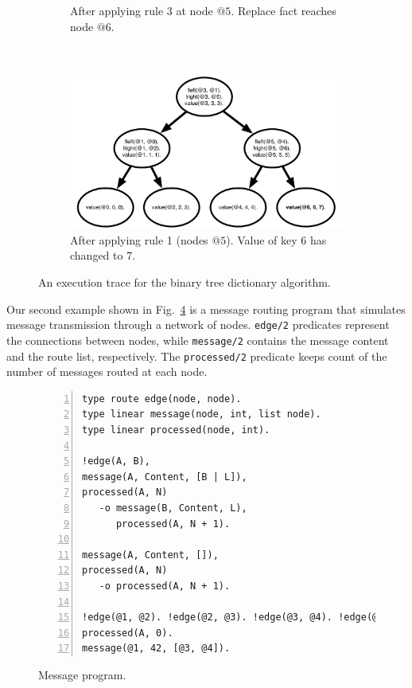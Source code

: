 \begin{figure}[h]
\begin{subfigure}[b]{0.5\textwidth}
                \caption{After applying rule 3 at node $@5$. Replace fact reaches node $@6$.}
                \label{fig:btree_trace3}
        \end{subfigure}%
        ~
        \begin{subfigure}[b]{0.5\textwidth}
                  \includegraphics[width=\textwidth]{btree_trace4}
                  \caption{After applying rule 1 (nodes $@5$). Value of key 6 has changed to 7.}
                  \label{fig:btree_trace4}
          \end{subfigure}
        \caption{An execution trace for the binary tree dictionary algorithm.}\label{fig:btree_trace}
\end{figure}

Our second example shown in Fig.~\ref{code:message} is a message routing program
that simulates message transmission through a network of nodes.
\texttt{edge/2} predicates represent the connections between nodes, while
\texttt{message/2} contains the message content and the route list, respectively.
The \texttt{processed/2} predicate keeps count of the number of messages routed at each node.

\begin{figure}[h!]
\small\begin{Verbatim}[numbers=left]
type route edge(node, node).
type linear message(node, int, list node).
type linear processed(node, int).

!edge(A, B),
message(A, Content, [B | L]),
processed(A, N)
   -o message(B, Content, L),
      processed(A, N + 1).

message(A, Content, []),
processed(A, N)
   -o processed(A, N + 1).

!edge(@1, @2). !edge(@2, @3). !edge(@3, @4). !edge(@1, @3).
processed(A, 0).
message(@1, 42, [@3, @4]).
\end{Verbatim}
\caption{Message program.}
  \label{code:message}
\end{figure}

